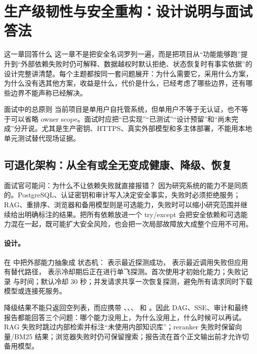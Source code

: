 \section{生产级韧性与安全重构：设计说明与面试答法}

\begin{summaryBox}{这一章回答什么}
这一章不是把安全名词罗列一遍，而是把项目从“功能能够跑”提升到“外部依赖失败时仍可解释、数据越权时默认拒绝、状态恢复时有事实依据”的设计完整讲清楚。每个主题都按同一套问题展开：为什么需要它，采用什么方案，为什么没有选其他方案，收益是什么，代价是什么，已经考虑了哪些边界，还有哪些边界不能声称已经解决。
\end{summaryBox}

\begin{riskBox}{面试中的总原则}
当前项目是单用户自托管系统，但单用户不等于无认证，也不等于可以省略 owner scope。面试时应把“已实现”“已测试”“设计预留”和“尚未完成”分开说。尤其是生产密钥、HTTPS、真实外部模型和多主体部署，不能用本地单元测试替代现场证据。
\end{riskBox}

\subsection{可退化架构：从全有或全无变成健康、降级、恢复}

\begin{qaBox}{面试官可能问：为什么不让依赖失败就直接报错？}
因为研究系统的能力不是同质的。PostgreSQL、认证密钥和审计写入决定安全事实，失败时必须拒绝服务；RAG、重排序、浏览器和备用模型则是可选能力，失败时可以缩小研究范围并继续给出明确标注的结果。把所有依赖放进一个 try/except 会把安全依赖和可选能力混在一起，既可能扩大安全风险，也会把一次局部故障放大成整个应用不可用。
\end{qaBox}

\paragraph{设计。}
在  中把外部能力抽象成  状态机： 表示最近探测成功， 表示最近调用失败但应用有替代路径， 表示冷却期后正在进行单飞探测。首次使用才初始化能力；失败记录  与时间；默认冷却 30 秒；并发请求共享一次恢复探测，避免所有请求同时下载模型或连接死服务。

降级结果不能只返回空列表，而应携带 、、、 和 。因此 DAG、SSE、审计和最终报告都能回答三个问题：哪个能力没用上，为什么没用上，什么时候可以再试。RAG 失败时跳过内部检索并标注“未使用内部知识库”；reranker 失败时保留向量/BM25 结果；浏览器失败时仍可保留搜索；报告流在首个正文输出前才允许切备用模型。

